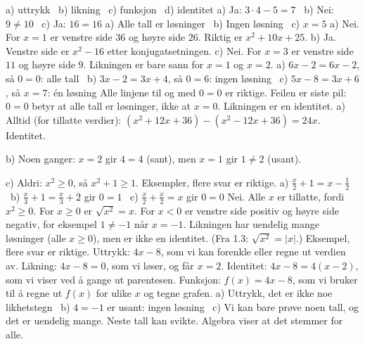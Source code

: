 
 a) uttrykk \ b) likning \ c) funksjon \ d) identitet
 a) Ja: $3\cdot4-5=7$ \ b) Nei: $9 \neq 10$ \ c) Ja: $16 = 16$
 a) Alle tall er løsninger \ b) Ingen løsning \ c) $x = 5$
 a) Nei. For $x = 1$ er venstre side $36$ og høyre side $26$. Riktig er $x^2 + 10x + 25$.
b) Ja. Venstre side er $x^2 - 16$ etter konjugatsetningen.
c) Nei. For $x = 3$ er venstre side $11$ og høyre side $9$. Likningen er bare sann for $x = 1$ og $x = 2$.
 a) $6x-2 = 6x-2$, så $0=0$: alle tall \ b) $3x-2 = 3x+4$, så $0 = 6$: ingen løsning \ c) $5x - 8 = 3x + 6$, så $x = 7$: én løsning
 Alle linjene til og med $0 = 0$ er riktige. Feilen er siste pil: $0 = 0$ betyr at alle tall er løsninger, ikke at $x = 0$. Likningen er en identitet.
 a) Alltid (for tillatte verdier): $(x^2+12x+36) - (x^2-12x+36) = 24x$. Identitet.\par
b) Noen ganger: $x = 2$ gir $4 = 4$ (sant), men $x = 1$ gir $1 \neq 2$ (usant).\par
c) Aldri: $x^2 \ge 0$, så $x^2 + 1 \ge 1$.
 Eksempler, flere svar er riktige. a) $\frac{x}{2} + 1 = x - \frac{1}{2}$ \ b) $\frac{x}{3} + 1 = \frac{x}{3} + 2$ gir $0 = 1$ \ c) $\frac{x}{2} + \frac{x}{2} = x$ gir $0 = 0$
 Nei. Alle $x$ er tillatte, fordi $x^2 \ge 0$. For $x \ge 0$ er $\sqrt{x^2} = x$. For $x < 0$ er venstre side positiv og høyre side negativ, for eksempel $1 \neq -1$ når $x = -1$. Likningen har uendelig mange løsninger (alle $x \ge 0$), men er ikke en identitet. (Fra 1.3: $\sqrt{x^2} = |x|$.)
 Eksempel, flere svar er riktige. Uttrykk: $4x - 8$, som vi kan forenkle eller regne ut verdien av. Likning: $4x - 8 = 0$, som vi løser, og får $x = 2$. Identitet: $4x - 8 = 4(x-2)$, som vi viser ved å gange ut parentesen. Funksjon: $f(x) = 4x - 8$, som vi bruker til å regne ut $f(x)$ for ulike $x$ og tegne grafen.
 a) Uttrykk, det er ikke noe likhetstegn \ b) $4 = -1$ er usant: ingen løsning \ c) Vi kan bare prøve noen tall, og det er uendelig mange. Neste tall kan svikte. Algebra viser at det stemmer for alle.

